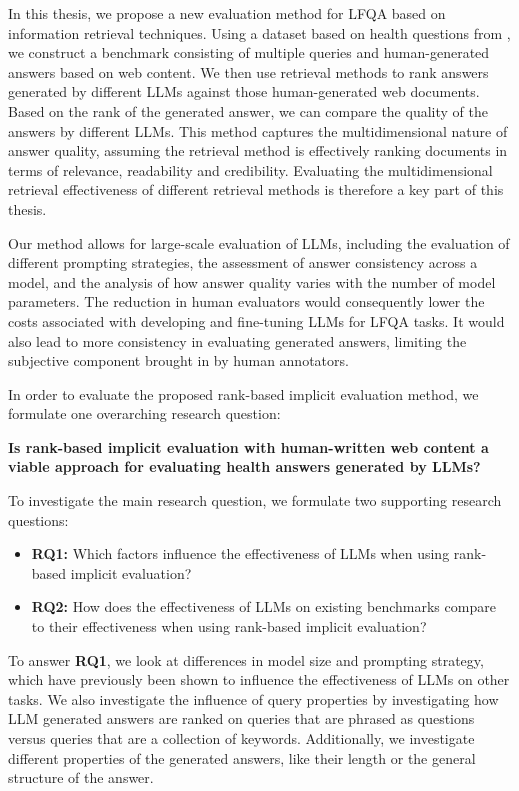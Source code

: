 In this thesis, we propose a new evaluation method for LFQA based on information retrieval techniques.
Using a dataset based on health questions from \cite{goeuriot:2021:Consumer}, we construct a benchmark consisting of multiple queries and human-generated answers based on web content.
We then use retrieval methods to rank answers generated by different LLMs against those human-generated web documents.
Based on the rank of the generated answer, we can compare the quality of the answers by different LLMs.
This method captures the multidimensional nature of answer quality, assuming the retrieval method is effectively ranking documents in terms of relevance, readability and credibility.
Evaluating the multidimensional retrieval effectiveness of different retrieval methods is therefore a key part of this thesis.

Our method allows for large-scale evaluation of LLMs, including the evaluation of different prompting strategies, the assessment of answer consistency across a model, and the analysis of how answer quality varies with the number of model parameters.
The reduction in human evaluators would consequently lower the costs associated with developing and fine-tuning LLMs for LFQA tasks.
It would also lead to more consistency in evaluating generated answers, limiting the subjective component brought in by human annotators.

In order to evaluate the proposed rank-based implicit evaluation method, we formulate one overarching research question:

\begin{center}
\textbf{Is rank-based implicit evaluation with human-written web content a viable approach for evaluating health answers generated by LLMs?}
\end{center}

To investigate the main research question, we formulate two supporting research questions:

\begin{itemize}
    \item \textbf{RQ1:} Which factors influence the effectiveness of LLMs when using rank-based implicit evaluation?
    \item \textbf{RQ2:} How does the effectiveness of LLMs on existing benchmarks compare to their effectiveness when using rank-based implicit evaluation?
\end{itemize}

To answer \textbf{RQ1}, we look at differences in model size and prompting strategy, which have previously been shown to influence the effectiveness of LLMs on other tasks.
We also investigate the influence of query properties by investigating how LLM generated answers are ranked on queries that are phrased as questions versus queries that are a collection of keywords.
Additionally, we investigate different properties of the generated answers, like their length or the general structure of the answer.

